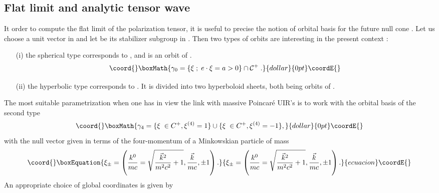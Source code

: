 \documentclass[a4paper,11pt,showpacs,preprintnumbers]{revtex4}
\def\setR{\mathbb{R}}
\begin{document}
\subsection{Flat limit and analytic tensor wave}
It order to compute the flat limit of the polarization tensor, it
is useful to precise the notion of orbital basis \myHighlight{$\gamma$}\coordHE{} for the
future null cone \coordHE{}
\cite{brmo}. Let us choose a unit vector \coordHE{} in \myHighlight{$\setR ^{5}$}\coordHE{} and
let \coordHE{} be its stabilizer subgroup in \coordHE{}. Then two
types of orbits are interesting in the present context :
\begin{itemize}
\item[(i)] the spherical type \coordHE{} corresponds to \myHighlight{$e\in V^{+}
\equiv \{ x\in \setR^5;\;\; x^0 >\sqrt{\parallel \vec
x\parallel^2+(x^4)^2} \}$}\coordHE{} , and is an orbit of \coordHE{}.
$$\coord{}\boxMath{\gamma_{0}=\{\xi\;;\;e\cdot\xi=a>0\}\cap  {\cal C}^{+}\;.}{dollar}{0pt}\coordE{}$$
\item[(ii)] the hyperbolic type  \coordHE{} corresponds to \coordHE{}.
It is divided into two hyperboloid sheets, both being orbits of
\coordHE{}.
\end{itemize}
The most suitable parametrization when one has in view the link
with massive Poincar\'e UIR's is to work with the orbital basis of
the second type
$$\coord{}\boxMath{\gamma_{4}=\{\xi\;\in C^{+},\xi^{(4)}=1 \}\cup\{\xi\;\in
C^{+},\xi^{(4)}=-1  \},}{dollar}{0pt}\coordE{}$$ with the null vector \myHighlight{$\xi$}\coordHE{} given in
terms of the four-momentum \coordHE{} of a Minkowskian
particle of mass \coordHE{}
\begin{equation}\coord{}\boxEquation{
\xi_{\pm}=\left(\frac{k^0}{mc}=\sqrt{\frac{\vec
k^2}{m^2c^2}+1},\frac{\vec k}{mc},\pm 1\right).
}{
\xi_{\pm}=\left(\frac{k^0}{mc}=\sqrt{\frac{\vec
k^2}{m^2c^2}+1},\frac{\vec k}{mc},\pm 1\right).
}{ecuacion}\coordE{}\end{equation}
An appropriate choice of global coordinates is given by
\end{document}
